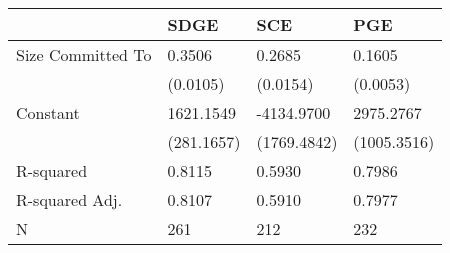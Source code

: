 \begin{tabular}{llll}
\hline
                  & SDGE       & SCE         & PGE          \\
\hline
Size Committed To & 0.3506     & 0.2685      & 0.1605       \\
                  & (0.0105)   & (0.0154)    & (0.0053)     \\
Constant          & 1621.1549  & -4134.9700  & 2975.2767    \\
                  & (281.1657) & (1769.4842) & (1005.3516)  \\
R-squared         & 0.8115     & 0.5930      & 0.7986       \\
R-squared Adj.    & 0.8107     & 0.5910      & 0.7977       \\
N                 & 261        & 212         & 232          \\
\hline
\end{tabular}